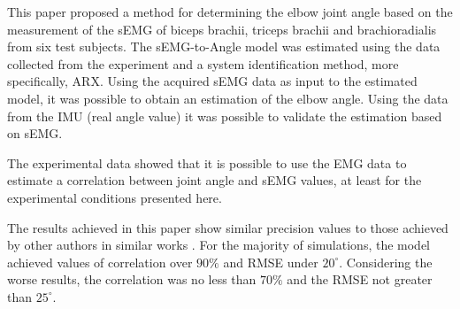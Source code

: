 \documentclass[letterpaper, 10 pt, conference]{ieeeconf}  %
\begin{document}
This paper proposed a method for determining the elbow joint angle based on the measurement of the sEMG of biceps brachii, triceps brachii and brachioradialis from six test subjects. The sEMG-to-Angle model was estimated using the data collected from the experiment and a system identification method, more specifically, ARX. Using the acquired sEMG data as input to the estimated model, it was possible to obtain an estimation of the elbow angle. Using the data from the IMU (real angle value) it was possible to validate the estimation based on sEMG.


The experimental data showed that it is possible to use the EMG data to estimate a correlation between joint angle and sEMG values, at least for the experimental conditions presented here.

The results achieved in this paper show similar precision values to those achieved by other authors in similar works \cite{Pang2015165,Liu1999391,Rahmatian2016158,Mamikoglu2016785}. For the majority of simulations, the model achieved values of correlation over $90\%$ and RMSE under $20^\circ$. Considering the worse results, the correlation was no less than $70\%$ and the RMSE not greater than $25^\circ$.



\end{document}
